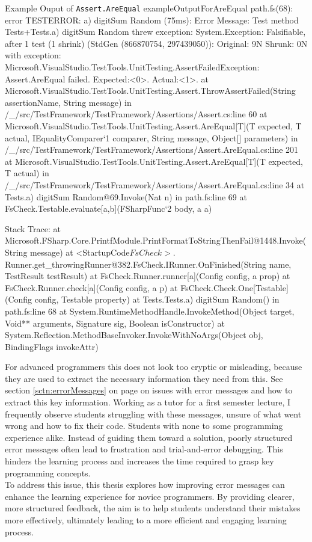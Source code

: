 \begin{fsharpoutput}%
{Example Ouput of \texttt{Assert.AreEqual}}%
{exampleOutputForAreEqual}
path\to\Tests.fs(68): error TESTERROR:
    a) digitSum Random (75ms): Error Message: Test method Tests+Tests.a) digitSum Random threw exception:
    System.Exception: Falsifiable, after 1 test (1 shrink) (StdGen (866870754, 297439050)):
    Original:
    9N
    Shrunk:
    0N
    with exception:
    Microsoft.VisualStudio.TestTools.UnitTesting.AssertFailedException: Assert.AreEqual failed. Expected:<0>. Actual:<1>.
        at Microsoft.VisualStudio.TestTools.UnitTesting.Assert.ThrowAssertFailed(String assertionName, String message) in /_/src/TestFramework/TestFramework/Assertions/Assert.cs:line 60
        at Microsoft.VisualStudio.TestTools.UnitTesting.Assert.AreEqual[T](T expected, T actual, IEqualityComparer`1 comparer, String message, Object[] parameters) in /_/src/TestFramework/TestFramework/Assertions/Assert.AreEqual.cs:line 201
        at Microsoft.VisualStudio.TestTools.UnitTesting.Assert.AreEqual[T](T expected, T actual) in /_/src/TestFramework/TestFramework/Assertions/Assert.AreEqual.cs:line 34
        at Tests.a) digitSum Random@69.Invoke(Nat n) in path\to\Tests.fs:line 69
        at FsCheck.Testable.evaluate[a,b](FSharpFunc`2 body, a a)

    Stack Trace:
        at Microsoft.FSharp.Core.PrintfModule.PrintFormatToStringThenFail@1448.Invoke(String message)
        at <StartupCode$FsCheck>.$Runner.get_throwingRunner@382.FsCheck.IRunner.OnFinished(String name, TestResult testResult)
        at FsCheck.Runner.runner[a](Config config, a prop)
        at FsCheck.Runner.check[a](Config config, a p)
        at FsCheck.Check.One[Testable](Config config, Testable property)
        at Tests.Tests.a) digitSum Random() in path\to\Tests.fs:line 68
        at System.RuntimeMethodHandle.InvokeMethod(Object target, Void** arguments, Signature sig, Boolean isConstructor)
        at System.Reflection.MethodBaseInvoker.InvokeWithNoArgs(Object obj, BindingFlags invokeAttr)
\end{fsharpoutput}

\noindent For advanced programmers this does not look too cryptic or misleading, because they are used to extract the necessary information they need from this.
See section \ref{sctn:errorMessages} on page \pageref{sctn:errorMessages} on issues with error messages and how to extract this key information.
Working as a tutor for a first semester lecture, I frequently observe students struggling with these messages, unsure of what went wrong and how to fix their code.
Students with none to some programming experience alike.
Instead of guiding them toward a solution, poorly structured error messages often lead to frustration and trial-and-error debugging.
This hinders the learning process and increases the time required to grasp key programming concepts.\\[5pt]
To address this issue, this thesis explores how improving error messages can enhance the learning experience for novice programmers.
By providing clearer, more structured feedback, the aim is to help students understand their mistakes more effectively,
ultimately leading to a more efficient and engaging learning process.


